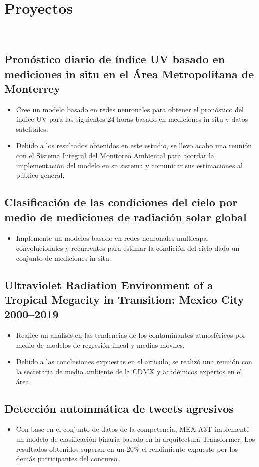 \documentclass[a3paper]{adcv_color}
\begin{document}
\section{Proyectos}\\
\begin{addmargin}[0.5em]{0.5em}
	\subsection{Pronóstico diario de índice UV basado en mediciones in situ en el Área Metropolitana de Monterrey}
	\begin{itemize}
		\item Cree un modelo basado en redes neuronales para obtener el pronóstico del índice UV para las siguientes 24 horas basado en mediciones in situ y datos satelitales.
		\item Debido a los resultados obtenidos en este estudio, se llevo acabo una reunión con el Sistema Integral del Monitoreo Ambiental para acordar la implementación del modelo en su sistema y comunicar sus estimaciones al público general.
	\end{itemize}
	\subsection{Clasificación de las condiciones del cielo por medio de mediciones de radiación solar global}
	\begin{itemize}
		\item Implemente un modelos basado en redes neuronales multicapa, convolucionales y recurrentes para estimar la condición del cielo dado un conjunto de mediciones in situ.
	\end{itemize}
	\subsection{Ultraviolet Radiation Environment of a Tropical Megacity in Transition: Mexico City 2000–2019}
	\begin{itemize}
		\item Realice un análisis en las tendencias de los contaminantes atmosféricos por medio de modelos de regresión lineal y medias móviles.
		\item Debido a las conclusiones expuestas en el articulo, se realizó una reunión con la secretaria de medio ambiente de la CDMX y académicos expertos en el área.
	\end{itemize}
	\subsection{Detección autommática de tweets agresivos}
	\begin{itemize}
		\item Con base en el conjunto de datos de la competencia, MEX-A3T implementé un modelo de clasificación binaria basado en la arquitectura Transformer. Los resultados obtenidos superan en un 20\% el rendimiento expuesto por los demás participantes del concurso.
	\end{itemize}

\end{addmargin}
\end{document}
